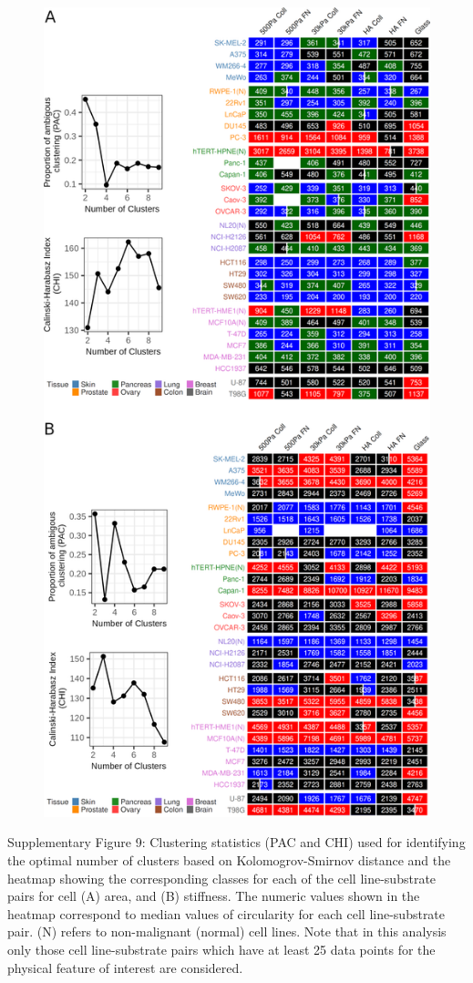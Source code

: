 \documentclass[11pt,letterpaper,english,oneside]{article} %
\begin{document}
\begin{figure}
    \centering
    \includegraphics[scale=0.95]{../Figures/Supplementary_Figure9/supplementary_figure9.png} 
    \caption{}
    \label{fig:fig9}
\end{figure}
\clearpage
\begin{adjustwidth}{1cm}{1cm}
  Supplementary Figure 9: Clustering statistics (PAC and CHI) used for identifying the optimal number of clusters based on Kolomogrov-Smirnov distance and 
  the heatmap showing the corresponding classes for each of the cell line-substrate pairs for cell (A) area, and (B) stiffness. 
  The numeric values shown in the heatmap correspond to median values of circularity for each cell line-substrate pair. (N) refers to non-malignant (normal) cell lines. 
  Note that in this analysis only those cell line-substrate pairs which have at least 25 data points for the physical feature of interest are considered.
\end{adjustwidth}
\end{document}

